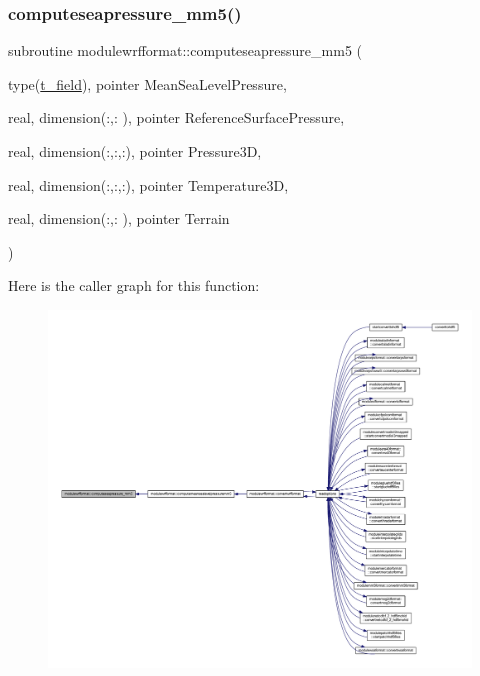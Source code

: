 \subsubsection{\texorpdfstring{computeseapressure\+\_\+mm5()}{computeseapressure\_mm5()}}
{\footnotesize\ttfamily subroutine modulewrfformat\+::computeseapressure\+\_\+mm5 (\begin{DoxyParamCaption}\item[{type(\mbox{\hyperlink{structmodulewrfformat_1_1t__field}{t\+\_\+field}}), pointer}]{Mean\+Sea\+Level\+Pressure,  }\item[{real, dimension(\+:,\+:  ), pointer}]{Reference\+Surface\+Pressure,  }\item[{real, dimension(\+:,\+:,\+:), pointer}]{Pressure3D,  }\item[{real, dimension(\+:,\+:,\+:), pointer}]{Temperature3D,  }\item[{real, dimension(\+:,\+:  ), pointer}]{Terrain }\end{DoxyParamCaption})\hspace{0.3cm}{\ttfamily [private]}}

Here is the caller graph for this function\+:\nopagebreak
\begin{figure}[H]
\begin{center}
\leavevmode
\includegraphics[width=350pt]{namespacemodulewrfformat_ad1de435678b34be1e80362a0f088aacc_icgraph}
\end{center}
\end{figure}
\mbox{\label{namespacemodulewrfformat_a34fc2d8fa7ad6c853cc7d37d0f31fc9b}} 
